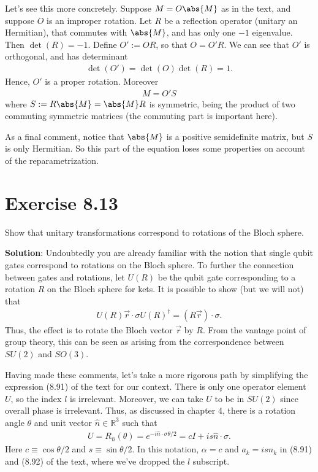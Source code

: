 \documentclass{book}
\begin{document}
    Let's see this more concretely. Suppose $M = O \abs{M}$ as in the text, and suppose $O$ is an improper rotation. Let $R$ be a reflection operator (unitary an Hermitian), that commutes with $\abs{M}$, and has only one $-1$ eigenvalue. Then $\det(R) = -1$. Define $O' := O R$, so that $O = O' R$. We can see that $O'$ is orthogonal, and has determinant
    \begin{align}
        \det(O') = \det(O)\det(R) = 1.
    \end{align}
    Hence, $O'$ is a proper rotation. Moreover
    \begin{align}
        M = O' S
    \end{align}
    where $S := R \abs{M} = \abs{M} R$ is symmetric, being the product of two commuting symmetric matrices (the commuting part is important here). 

    As a final comment, notice that $\abs{M}$ is a positive semidefinite matrix, but $S$ is only Hermitian. So this part of the equation loses some properties on account of the reparametrization. 

\section*{Exercise 8.13}
    Show that unitary transformations correspond to rotations of the Bloch sphere. 

    \textbf{Solution}: Undoubtedly you are already familiar with the notion that single qubit gates correspond to rotations on the Bloch sphere. To further the connection between gates and rotations, let $U(R)$ be the qubit gate corresponding to a rotation $R$ on the Bloch sphere for kets. It is possible to show (but we will not) that
    \begin{align}
        U(R) \vec{r}\cdot \sigma U(R)^\dagger = (R \vec{r}) \cdot \sigma.
    \end{align}
    Thus, the effect is to rotate the Bloch vector $\vec{r}$ by $R$. From the vantage point of group theory, this can be seen as arising from the correspondence between $SU(2)$ and $SO(3)$.

    Having made these comments, let's take a more rigorous path by simplifying the expression (8.91) of the text for our context. There is only one operator element $U$, so the index $l$ is irrelevant. Moreover, we can take $U$ to be in $SU(2)$ since overall phase is irrelevant. Thus, as discussed in chapter 4, there is a rotation angle $\theta$ and unit vector $\hat{n} \in \mathbb{R}^3$ such that
    \begin{align}
        U = R_{\hat{n}}(\theta) = e^{-i \hat{n}\cdot \sigma \theta/2} = c I + i s \hat{n}\cdot\sigma. 
    \end{align}
    Here $c \equiv \cos \theta/2$ and $s \equiv \sin\theta/2$. In this notation, $\alpha = c$ and $a_k = i s n_k$ in (8.91) and (8.92) of the text, where we've dropped the $l$ subscript.
\end{document}

